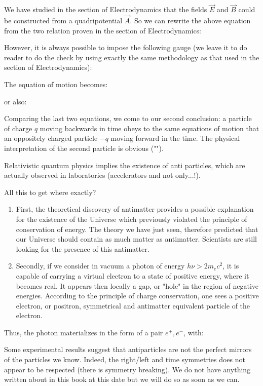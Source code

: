 	We have studied in the section of Electrodynamics that the fields $\vec{E}$ and $\vec{B}$ could be constructed from a quadripotential $\vec{A}$. So we can rewrite the above equation from the two relation proven in the section of Electrodynamics:
	
	However, it is always possible to impose the following gauge (we leave it to do reader to do the check by using exactly the same methodology as that used in the section of Electrodynamics):
	
	The equation of motion becomes:
	
	or also:
	
	Comparing the last two equations, we come to our second conclusion: a particle of charge $q$ moving backwards in time obeys to the same equations of  motion that an oppositely charged particle $-q$ moving forward in the time. The physical interpretation of the second particle is obvious ("").

	Relativistic quantum physics implies the existence of anti particles, which are actually observed in laboratories (accelerators and not only...!).

	All this to get where exactly?
	\begin{enumerate}
		\item First, the theoretical discovery of antimatter provides a possible explanation for the existence of the Universe which previously violated the principle of conservation of energy. The theory we have just seen, therefore predicted that our Universe should contain as much matter as antimatter. Scientists are still looking for the presence of this antimatter.

		\item Secondly, if we consider in vacuum a photon of energy $h\nu>2m_ec^2$, it is capable of carrying a virtual electron to a state of positive energy, where it becomes real. It appears then locally a gap, or "hole" in the region of negative energies. According to the principle of charge conservation, one sees a positive electron, or positron, symmetrical and antimatter equivalent particle of the electron.
	\end{enumerate}
	Thus, the photon materializes in the form of a pair $e^+,e^{-}$, with:
	
	\begin{tcolorbox}[title=Remark,colframe=black,arc=10pt]
	Some experimental results suggest that antiparticles are not the perfect mirrors of the particles we know. Indeed, the right/left and time symmetries does not appear to be respected (there is symmetry breaking). We do not have anything written about in this book at this date but we will do so as soon as we can.
	\end{tcolorbox}
	
